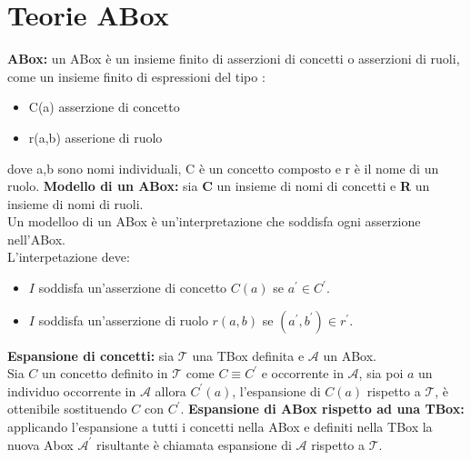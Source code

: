 \documentclass[../main.tex]{subfiles}
\newcommand{\spazio}{\vspace{2em} \newline}
\begin{document}
   \section{Teorie ABox}
   \textbf{ABox:} un ABox è un insieme finito di asserzioni di concetti o asserzioni di ruoli, come un insieme finito di espressioni del tipo :
   \begin{itemize}
      \item C(a) asserzione di concetto
      \item r(a,b) asserione di ruolo
   \end{itemize} 
   dove a,b sono nomi individuali, C è un concetto composto e r è il nome di un ruolo.
   \spazio
   \textbf{Modello di un ABox:} sia \textbf{C} un insieme di nomi di concetti e \textbf{R} un insieme di nomi di ruoli.\\
   Un modelloo di un ABox è un'interpretazione che soddisfa ogni asserzione nell'ABox.\\
   L'interpetazione deve:
   \begin{itemize}
      \item $I$ soddisfa un'asserzione di concetto $C(a)$ se $a^\prime \in C^\prime$.
      \item $I$ soddisfa un'asserzione di ruolo $r(a,b)$ se $(a^\prime, b^\prime) \in r^\prime$. 
   \end{itemize}
   \vspace{2em}
   \textbf{Espansione di concetti:} sia $\mathcal{T}$ una TBox definita e $\mathcal{A}$ un ABox.\\
   Sia $C$ un concetto definito in $\mathcal{T}$ come $C \equiv C^\prime$ e occorrente in $\mathcal{A}$, sia poi $a$ un individuo occorrente in $\mathcal{A}$ allora $C^\prime (a)$, l'espansione di $C(a)$ rispetto a $\mathcal{T}$, è ottenibile sostituendo $C$ con $C^\prime$.
   \spazio
   \textbf{Espansione di ABox rispetto ad una TBox:} applicando l'espansione a tutti i concetti nella ABox e definiti nella TBox la nuova Abox $\mathcal{A}^\prime$ risultante è chiamata espansione di $\mathcal{A}$ rispetto a $\mathcal{T}$.
\end{document}
